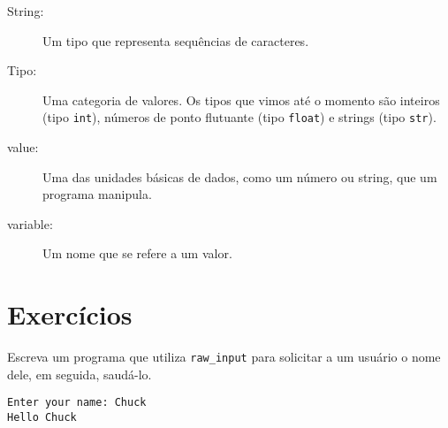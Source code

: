 {{{{{{{{{{{{{{{{{\begin{description}
\item[String:] Um tipo que representa sequências de caracteres.

\item[Tipo:] Uma categoria de valores. Os tipos que vimos até o momento 
são inteiros (tipo {\tt int}), números de ponto flutuante (tipo {\tt float}) 
e strings (tipo {\tt str}).

\item[value:] Uma das unidades básicas de dados, como um número ou string,
que um programa manipula.

\item[variable:] Um nome que se refere a um valor.

\end{description}

\section{Exercícios}

\begin{ex}
Escreva um programa que utiliza \verb"raw_input" para solicitar a um usuário o nome dele,
em seguida, saudá-lo.

\begin{verbatim}
Enter your name: Chuck
Hello Chuck
\end{verbatim}

\end{ex}

}}}}}}}}}}}}}}}}}
